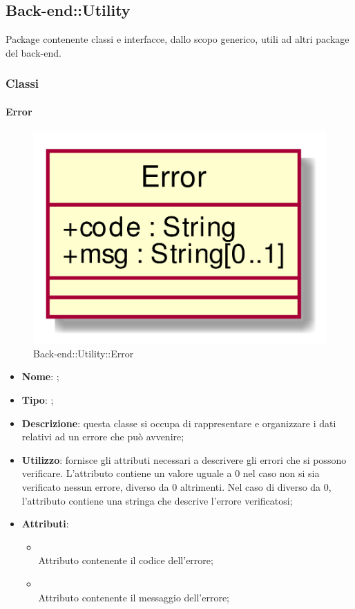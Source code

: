 \subsection{Back-end::Utility}
Package contenente classi e interfacce, dallo scopo generico, utili ad altri package del back-end.
\subsubsection{Classi}
\hypertarget{Error_label}{\paragraph{Error}}
\begin{figure}[h]
	\centering
	\includegraphics[width=\textwidth,height=\textheight,keepaspectratio]{images/ClassError.png}
	\caption{Back-end::Utility::Error}
\end{figure}
\begin{itemize}
	\item \textbf{Nome}: ;
	\item \textbf{Tipo}: ;
	\item \textbf{Descrizione}: questa classe si occupa di rappresentare e organizzare i dati relativi ad un errore che può avvenire;
	\item \textbf{Utilizzo}: fornisce gli attributi necessari a descrivere gli errori che si possono verificare.
L'attributo  contiene un valore uguale a 0 nel caso non si sia verificato nessun errore, diverso da 0 altrimenti.
Nel caso di  diverso da 0, l'attributo  contiene una stringa che descrive l'errore verificatosi;
	\item \textbf{Attributi}:
	\begin{itemize}
		\item[]  \\
		Attributo contenente il codice dell'errore;
		\item[]  \\
		Attributo contenente il messaggio dell'errore;
	\end{itemize}
\end{itemize}
\FloatBarrier

